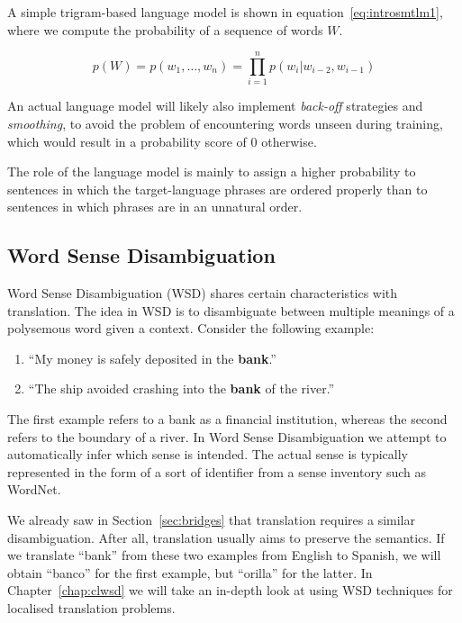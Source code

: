 A simple trigram-based language model is shown in equation~\ref{eq:introsmtlm1}, where we compute the probability of a sequence of words $W$.

\begin{equation}
p(W) = p(w_1,\ldots,w_n) = \prod_{i=1}^{n} p(w_i|w_{i-2},w_{i-1})
\label{eq:introsmtlm1}
\end{equation}

An actual language model will likely also implement \emph{back-off} strategies and
\emph{smoothing}, to avoid the problem of encountering words unseen during
training, which would result in a probability score of $0$ otherwise.

The role of the language model is mainly to assign a higher probability to
sentences in which the target-language phrases are ordered properly than
to sentences in which phrases are in an unnatural order.

\subsection{Word Sense Disambiguation}

Word Sense Disambiguation (WSD) shares certain characteristics with
translation. The idea in WSD is to disambiguate between multiple meanings of a
polysemous word given a context. Consider the following example:

\begin{enumerate}
\item ``My money is safely deposited in the \textbf{bank}.''
\item ``The ship avoided crashing into the \textbf{bank} of the river.''
\end{enumerate}

The first example refers to a bank as a financial institution, whereas the
second refers to the boundary of a river. In Word Sense Disambiguation we
attempt to automatically infer which sense is intended. The actual sense is
typically represented in the form of a sort of identifier from a sense inventory
such as WordNet.

We already saw in Section~\ref{sec:bridges} that translation requires a
similar disambiguation. After all, translation usually aims to preserve the
semantics. If we translate ``bank'' from these two examples from English to
Spanish, we will obtain ``banco'' for the first example, but ``orilla'' for the
latter. In Chapter~\ref{chap:clwsd} we will take an in-depth look at using
WSD techniques for localised translation problems.

